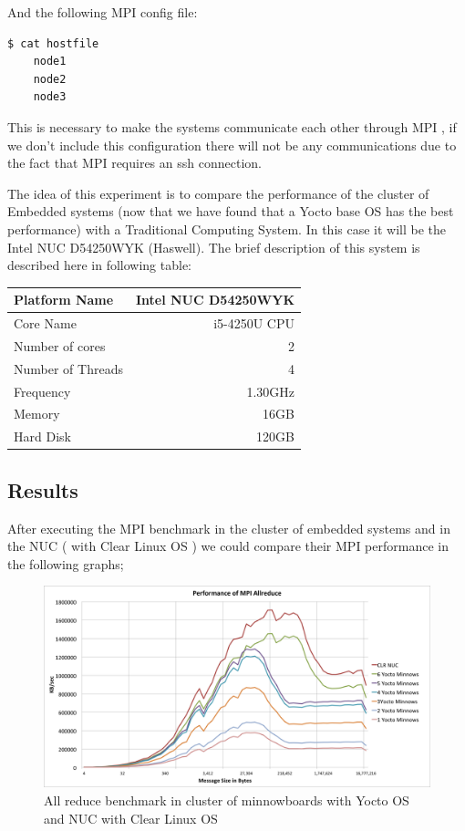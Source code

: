And the following MPI config file:


\begin{lstlisting}[frame=single,language=bash]
  $ cat hostfile
    node1
    node2
    node3
\end{lstlisting}

This is necessary to make the systems communicate each other through MPI , if we
don't include this configuration there will not be any communications due to the
fact that MPI requires an ssh connection. 

The idea of this experiment is to compare the performance of the cluster of
Embedded systems (now that we have found that a Yocto base OS has the best
performance) with a Traditional Computing System. In this case it will be the
Intel NUC D54250WYK (Haswell). The brief description of this system is
described here in following table: 

    \begin{center}
    \begin{tabular}{ | l | r |}
        \hline
        Platform Name & Intel NUC D54250WYK \\ \hline
        Core Name & i5-4250U CPU  \\ \hline
        Number of cores & 2 \\ \hline
        Number of Threads & 4 \\ \hline
        Frequency & 1.30GHz \\ \hline
        Memory & 16GB\\ \hline
        Hard Disk & 120GB \\ \hline
    \end{tabular}
    \end{center}



\subsection{Results}

After executing the MPI benchmark in the cluster of embedded systems  and in
the NUC ( with Clear Linux OS ) we could compare their MPI performance in the
following graphs; 


\begin{figure}[H]
\centering
\includegraphics[width=1.0\textwidth]{images/mpbench_cluster_experiments/mpi_all_reduce.png}
\caption{All reduce  benchmark in cluster of minnowboards with Yocto OS and NUC
with Clear Linux OS}
\label{all_reduce_cluster}
\end{figure}


